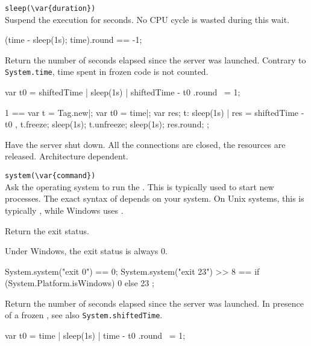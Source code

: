 \begin{urbiscriptapi}
\item \lstinline|sleep(\var{duration})|\\
  Suspend the execution for  seconds.  No CPU cycle is
  wasted during this wait.

\begin{urbiassert}
(time - {sleep(1s); time}).round == -1;
\end{urbiassert}

\item[shiftedTime] Return the number of seconds elapsed since the
  \urbi server was launched.  Contrary to \lstinline|System.time|,
  time spent in frozen code is not counted.
\begin{urbiassert}
{ var t0 = shiftedTime | sleep(1s) | shiftedTime - t0 }.round ~= 1;

  1 ==
  {
    var t = Tag.new|;
    var t0 = time|;
    var res;
    t: { sleep(1s) | res = shiftedTime - t0 },
    t.freeze;
    sleep(1s);
    t.unfreeze;
    sleep(1s);
    res.round;
  };
\end{urbiassert}

\item[shutdown] Have the \urbi server shut down.  All the connections
  are closed, the resources are released.  Architecture dependent.

\item \lstinline|system(\var{command})|\\
  Ask the operating system to run the .  This is
  typically used to start new processes.  The exact syntax of
   depends on your system.  On Unix systems, this is
  typically , while Windows uses .

  Return the exit status.

  \begin{windows}
    Under Windows, the exit status is always 0.
  \end{windows}

\begin{urbiassert}
System.system("exit 0") == 0;
System.system("exit 23") >> 8
       == { if (System.Platform.isWindows) 0 else 23 };
\end{urbiassert}


\item[time] Return the number of seconds elapsed since the \urbi
  server was launched.  In presence of a frozen , see
  also \lstinline|System.shiftedTime|.
\begin{urbiassert}
{ var t0 = time | sleep(1s) | time - t0 }.round ~= 1;


\end{urbiassert}
\end{urbiscriptapi}
